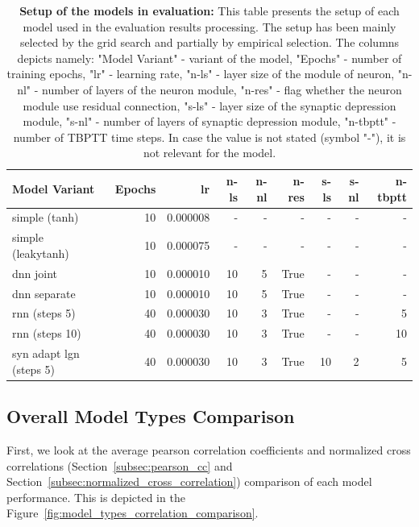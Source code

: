 \begin{table}
    \centering\footnotesize\sf
    \begin{tabular}{lrrrrrrrr}
        \toprule
        Model Variant & Epochs & lr & n-ls & n-nl & n-res & s-ls & s-nl & n-tbptt \\
        \midrule
        simple (tanh) & 10 & 0.000008 & - & - & - & - & - & - \\
        simple (leakytanh) & 10 & 0.000075 & - & - & - & - & - & - \\
        dnn joint & 10 & 0.000010 & 10 & 5 & True & - & - & - \\
        dnn separate & 10 & 0.000010 & 10 & 5 & True & - & - & - \\
        rnn (steps 5) & 40 & 0.000030 & 10 & 3 & True & - & - & 5 \\
        rnn (steps 10) & 40 & 0.000030 & 10 & 3 & True & - & - & 10 \\
        syn adapt lgn (steps 5) & 40 & 0.000030 & 10 & 3 & True & 10 & 2 & 5 \\
        \bottomrule
        \end{tabular}
    \caption{\textbf{Setup of the models in evaluation:} This table presents the setup of each model used in the evaluation results processing. The setup has been mainly selected by the grid search and partially by empirical selection. The columns depicts namely: "Model Variant" - variant of the model, "Epochs" - number of training epochs, "lr" - learning rate, "n-ls" - layer size of the module of neuron, "n-nl" - number of layers of the neuron module, "n-res" - flag whether the neuron module use residual connection, "s-ls" - layer size of the synaptic depression module, "s-nl" - number of layers of synaptic depression module, "n-tbptt" - number of TBPTT time steps. In case the value is not stated (symbol "-"), it is not relevant for the model.}
    \label{tab:evaluation_setup}
\end{table}

\subsection{Overall Model Types Comparison}
\label{subsec:overall_model_types_comparison}
First, we look at the average pearson correlation coefficients and normalized cross correlations (Section~\ref{subsec:pearson_cc} and Section~\ref{subsec:normalized_cross_correlation}) comparison of each model performance. This is depicted in the Figure~\ref{fig:model_types_correlation_comparison}.

